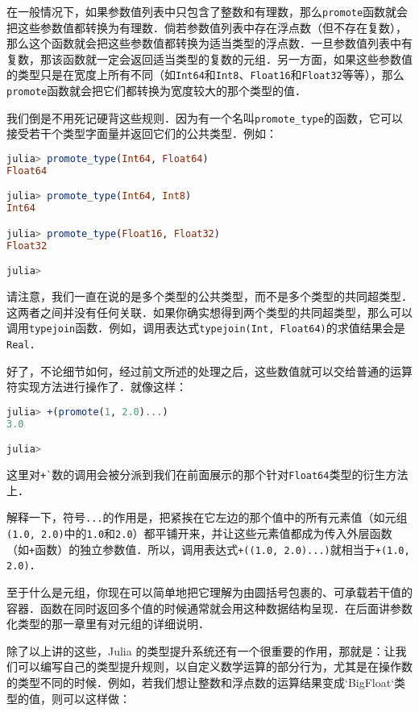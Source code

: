 在一般情况下，如果参数值列表中只包含了整数和有理数，那么\verb|promote|函数就会把这些参数值都转换为有理数．倘若参数值列表中存在浮点数（但不存在复数），那么这个函数就会把这些参数值都转换为适当类型的浮点数．一旦参数值列表中有复数，那该函数就一定会返回适当类型的复数的元组．另一方面，如果这些参数值的类型只是在宽度上所有不同（如\verb|Int64|和\verb|Int8|、\verb|Float16|和\verb|Float32|等等），那么\verb|promote|函数就会把它们都转换为宽度较大的那个类型的值．

我们倒是不用死记硬背这些规则．因为有一个名叫\verb|promote_type|的函数，它可以接受若干个类型字面量并返回它们的公共类型．例如：
\begin{lstlisting}[language=julia]
julia> promote_type(Int64, Float64)
Float64

julia> promote_type(Int64, Int8)
Int64

julia> promote_type(Float16, Float32)
Float32

julia> 
\end{lstlisting}

请注意，我们一直在说的是多个类型的公共类型，而不是多个类型的共同超类型．这两者之间并没有任何关联．如果你确实想得到两个类型的共同超类型，那么可以调用\verb|typejoin|函数．例如，调用表达式\verb|typejoin(Int, Float64)|的求值结果会是\verb|Real|．

好了，不论细节如何，经过前文所述的处理之后，这些数值就可以交给普通的运算符实现方法进行操作了．就像这样：
\begin{lstlisting}[language=julia]
julia> +(promote(1, 2.0)...)
3.0

julia> 
\end{lstlisting}

这里对\verb|+`|数的调用会被分派到我们在前面展示的那个针对\verb|Float64|类型的衍生方法上．

解释一下，符号\verb|...|的作用是，把紧挨在它左边的那个值中的所有元素值（如元组\verb|(1.0, 2.0)|中的\verb|1.0|和\verb|2.0|）都平铺开来，并让这些元素值都成为传入外层函数（如\verb|+|函数）的独立参数值．所以，调用表达式\verb|+((1.0, 2.0)...)|就相当于\verb|+(1.0, 2.0)|．

至于什么是元组，你现在可以简单地把它理解为由圆括号包裹的、可承载若干值的容器．函数在同时返回多个值的时候通常就会用这种数据结构呈现．在后面讲参数化类型的那一章里有对元组的详细说明．

除了以上讲的这些，Julia 的类型提升系统还有一个很重要的作用，那就是：让我们可以编写自己的类型提升规则，以自定义数学运算的部分行为，尤其是在操作数的类型不同的时候．例如，若我们想让整数和浮点数的运算结果变成`BigFloat`类型的值，则可以这样做：

